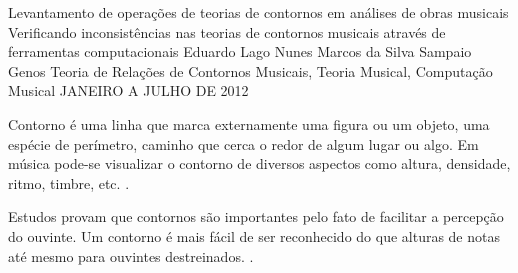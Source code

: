 \documentclass[11pt]{article}
\begin{document}
\graphicspath{{figs/}}


\dadosRelatorioFinal
{Levantamento de operações de teorias de contornos em análises de
  obras musicais}
{Verificando inconsistências nas teorias de contornos musicais através
  de ferramentas computacionais }
{Eduardo Lago Nunes}
{Marcos da Silva Sampaio}
{Genos}
{Teoria de Relações de Contornos Musicais, Teoria Musical, Computação Musical}
{JANEIRO A JULHO DE 2012}


\newpage

\setcounter{page}{1}
\onehalfspace

\label{sec:introducao}


Contorno é uma linha que marca externamente uma figura ou um objeto, uma espécie
de perímetro, caminho que cerca o redor de algum lugar ou algo. Em música pode-se
visualizar o contorno de diversos aspectos como altura, densidade, ritmo, timbre, etc.
\cite[p. 01]{Sampaio2008}.

Estudos provam que contornos são importantes pelo fato de facilitar
a percepção do ouvinte. Um contorno é mais fácil de ser reconhecido
do que alturas de notas até mesmo para ouvintes destreinados.
\cite[p. 225]{Marvin1987}.
\end{document}
